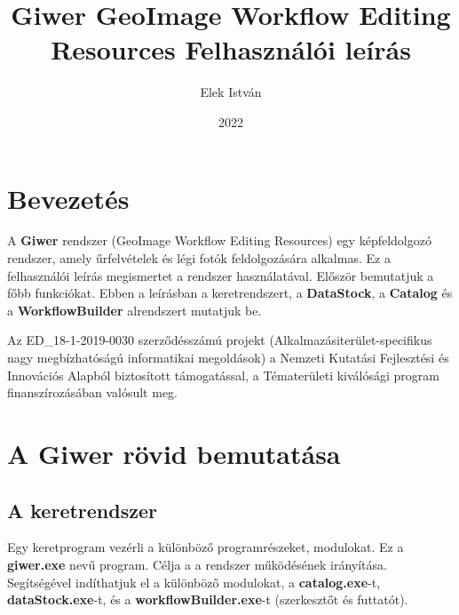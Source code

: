 \documentclass[a4paper,12pt]{article}
\begin{document}
\author{Elek István}

\title{Giwer \linebreak \linebreak GeoImage Workflow Editing Resources  \linebreak  \linebreak \small Felhasználói leírás \linebreak \linebreak}


\date{2022}


\setcounter{tocdepth}{3}
\maketitle
\newpage
\tableofcontents
\newpage


\section*{Bevezetés}

A \textbf{Giwer} rendszer (GeoImage Workflow Editing Resources) egy képfeldolgozó rendszer, amely űrfelvételek és légi fotók feldolgozására alkalmas. Ez a felhasználói leírás megismertet a rendszer használatával. Először bemutatjuk a főbb funkciókat. Ebben a leírásban a keretrendszert, a \textbf{DataStock}, a \textbf{Catalog} és a \textbf{WorkflowBuilder} alrendszert mutatjuk be. 

Az ED\_18-1-2019-0030 szerződésszámú projekt (Alkalmazásiterület-specifikus nagy megbízhatóságú informatikai megoldások)  a Nemzeti Kutatási Fejlesztési és Innovációs Alapból biztosított támogatással, a Tématerületi kiválósági program finanszírozásában valósult meg.



\section{A Giwer rövid bemutatása}

\subsection{A keretrendszer}

Egy keretprogram vezérli a különböző programrészeket, modulokat. Ez a \textbf{giwer.exe} nevű program. Célja a a rendszer működésének irányítása. Segítségével indíthatjuk el a különböző modulokat, a \textbf{catalog.exe}-t, \textbf{dataStock.exe}-t, és a \textbf{workflowBuilder.exe}-t (szerkesztőt és futtatót). 
\end{document}
